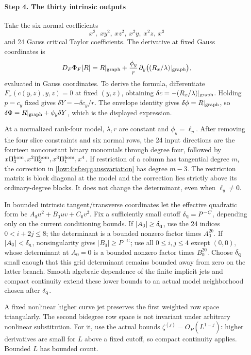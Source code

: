 \documentclass[11pt]{amsart}
\theoremstyle{definition}
\theoremstyle{remark}
\numberwithin{equation}{section}
\begin{document}
\paragraph{Step 4. The thirty intrinsic outputs}
Take the six normal coefficients
\[
x^2,\ xy^2,\ xz^2,\ x^2y,\ x^2z,\ x^3
\]
and 24 Gauss critical Taylor coefficients. The derivative at fixed Gauss coordinates is
\begin{equation}\label{low:4:sf:eq:gaussvariation}
D_F\Phi_F[R]
=R|_{\rm graph}+
\frac{\phi_y}{r}\,\partial_y\bigl((R_x/\lambda)|_{\rm graph}\bigr),
\end{equation}
evaluated in Gauss coordinates. To derive the formula, differentiate $F_x(c(y,z),y,z)=0$ at fixed $(y,z)$, obtaining $\delta c=-(R_x/\lambda)|_{\rm graph}$. Holding $p=c_y$ fixed gives $\delta Y=-\delta c_y/r$. The envelope identity gives $\delta\phi=R|_{\rm graph}$, so $\delta\Phi=R|_{\rm graph}+\phi_y\delta Y$, which is the displayed expression. 

At a normalized rank-four model, $\lambda,r$ are constant and $\phi_y=\ell_y$. After removing the four slice constraints and six normal rows, the 24 input directions are the fourteen nonconstant binary monomials through degree four, followed by $x\Pi_3^{\rm hom},x^2\Pi_2^{\rm hom},x^3\Pi_1^{\rm hom},x^4$. If restriction of a column has tangential degree $m$, the correction in \eqref{low:4:sf:eq:gaussvariation} has degree $m-3$. The restriction matrix is block diagonal at the model and the correction lies strictly above its ordinary-degree blocks. It does not change the determinant, even when $\ell_y\ne0$.

In bounded intrinsic tangent/transverse coordinates let the effective quadratic form be $A_0u^2+B_0uv+C_0v^2$. Fix a sufficiently small cutoff $\delta_{\rm q}=P^{-C}$, depending only on the current conditioning bounds. If $|A_0|\ge\delta_{\rm q}$, use the 24 indices $0<i+2j\le8$; the determinant is a bounded nonzero factor times $A_0^{20}$. If $|A_0|<\delta_{\rm q}$, nonsingularity gives $|B_0|\ge P^{-C}$; use all $0\le i,j\le4$ except $(0,0)$, whose determinant at $A_0=0$ is a bounded nonzero factor times $B_0^{20}$. Choose $\delta_{\rm q}$ small enough that this grid determinant remains bounded away from zero on the latter branch. Smooth algebraic dependence of the finite implicit jets and compact continuity extend these lower bounds to an actual model neighborhood chosen after $\delta_{\rm q}$.

A fixed nonlinear higher curve jet preserves the first weighted row space triangularly. The second bidegree row space is not invariant under arbitrary nonlinear substitution. For it, use the actual bounds $\zeta^{(j)}=O_P(L^{1-j})$: higher derivatives are small for $L$ above a fixed cutoff, so compact continuity applies. Bounded $L$ has bounded count.
\end{document}
